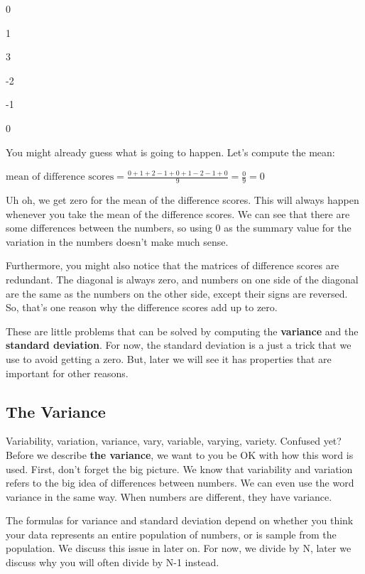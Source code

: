 \documentclass[
]{book}
\begin{document}
0

1

3

-2

-1

0

You might already guess what is going to happen. Let's compute the mean:

\(\text{mean of difference scores} = \frac{0+1+2-1+0+1-2-1+0}{9} = \frac{0}{9} = 0\)

Uh oh, we get zero for the mean of the difference scores. This will always happen whenever you take the mean of the difference scores. We can see that there are some differences between the numbers, so using 0 as the summary value for the variation in the numbers doesn't make much sense.

Furthermore, you might also notice that the matrices of difference scores are redundant. The diagonal is always zero, and numbers on one side of the diagonal are the same as the numbers on the other side, except their signs are reversed. So, that's one reason why the difference scores add up to zero.

These are little problems that can be solved by computing the \textbf{variance} and the \textbf{standard deviation}. For now, the standard deviation is a just a trick that we use to avoid getting a zero. But, later we will see it has properties that are important for other reasons.

\hypertarget{the-variance}{%
\subsection{The Variance}\label{the-variance}}

Variability, variation, variance, vary, variable, varying, variety. Confused yet? Before we describe \textbf{the variance}, we want to you be OK with how this word is used. First, don't forget the big picture. We know that variability and variation refers to the big idea of differences between numbers. We can even use the word variance in the same way. When numbers are different, they have variance.

\begin{marginnote}

The formulas for variance and standard deviation depend on whether you think your data represents an entire population of numbers, or is sample from the population. We discuss this issue in later on. For now, we divide by N, later we discuss why you will often divide by N-1 instead.

\end{marginnote}
\end{document}
